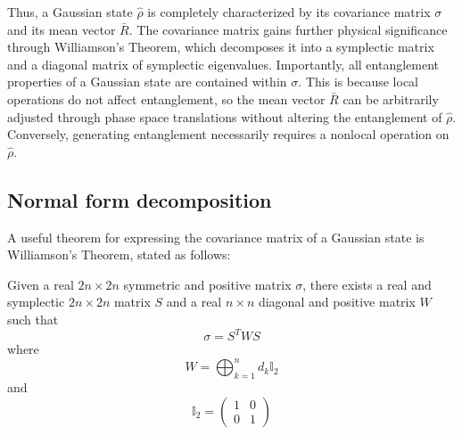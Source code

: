 Thus, a Gaussian state $\hat{\rho}$ is completely characterized by its covariance matrix $\sigma$ and its mean vector $\bar{R}$. The covariance matrix gains further physical significance through Williamson's Theorem, which decomposes it into a symplectic matrix and a diagonal matrix of symplectic eigenvalues. Importantly, all entanglement properties of a Gaussian state are contained within $\sigma$. This is because local operations do not affect entanglement, so the mean vector $\bar{R}$ can be arbitrarily adjusted through phase space translations without altering the entanglement of $\hat{\rho}$. Conversely, generating entanglement necessarily requires a nonlocal operation on $\hat{\rho}$.

\subsection{Normal form decomposition}
A useful theorem for expressing the covariance matrix of a Gaussian state is Williamson's Theorem, stated as follows:

\begin{theorem}
    Given a real $2n \times 2n$ symmetric and positive matrix $\sigma$, there exists a real and symplectic $2n \times 2n$ matrix $S$ and a real $n \times n$ diagonal and positive matrix $W$ such that
    \begin{equation}
        \sigma = S^T W S
    \end{equation}
    where
    \begin{equation}
        W = \bigoplus_{k=1}^{n} d_k \mathbb{I}_2
    \end{equation}
    and
    \begin{equation}
        \mathbb{I}_2 = \begin{pmatrix} 1 & 0 \\ 0 & 1 \end{pmatrix}
    \end{equation}
\end{theorem}

